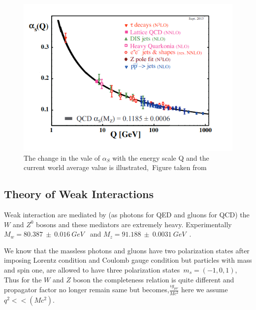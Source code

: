 \begin{figure}[h!]
\centering
\includegraphics[scale=0.6]{chapter1/alphs1.png}
\caption{The change in the vale of $\alpha_{S}$ with the energy scale Q and the current world average value is illustrated,~Figure taken from~\cite{denterria2015highprecision}}
\end{figure}

\subsection{Theory of Weak Interactions}
Weak interaction are mediated by (as photons for QED and gluons for QCD) the $W$ and $Z^{0}$ bosons and these mediators are extremely heavy. Experimentally $M_{w}=80.387~\pm~0.016~GeV$~\cite{PhysRevD.98.030001} and $M_{z}=91.188~\pm~0.0031~GeV$~\cite{PhysRevD.98.030001}.

We know that the massless photons and gluons have two polarization states after imposing Lorentz condition and Coulomb gauge condition but particles with mass and spin one, are allowed to have three polarization states~$m_{s}=(-1,0,1)$, Thus for the $W$ and $Z$ boson the completeness relation is quite different and propagator factor no longer remain same but becomes,$\frac{\iota g_{\mu\nu}}{Mc^{2}}$ here we assume $q^{2}<<(Mc^{2})$.
